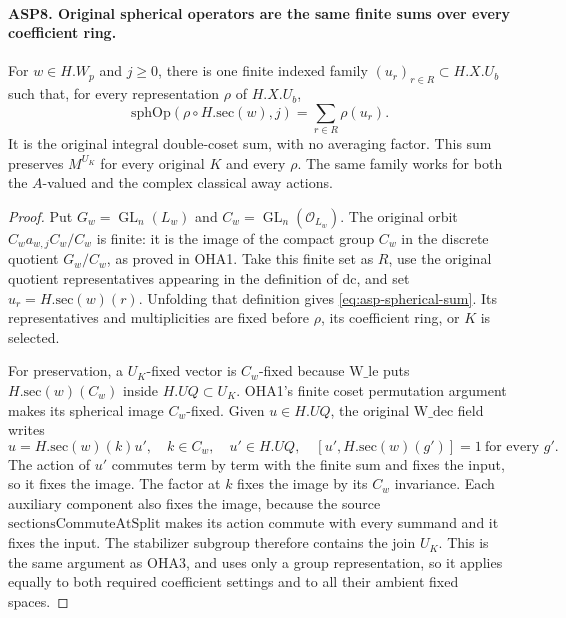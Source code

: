 \paragraph{ASP8. Original spherical operators are the same finite sums over every coefficient ring.}
\label{claim:ASP8}
For $w\in H.W_p$ and $j\geq0$, there is one
finite indexed family $(u_r)_{r\in R}\subset H.X.U_b$
such that, for every representation $\rho$ of
$H.X.U_b$,
\begin{equation}\label{eq:asp-spherical-sum}
 \mathrm{sphOp}(\rho\circ H.\mathrm{sec}(w),j)
                           =\sum_{r\in R}\rho(u_r).
\end{equation}
It is the original integral double-coset sum, with
no averaging factor.  This sum preserves
$M^{U_K}$ for every original $K$ and every $\rho$.
The same family works for both the $A$-valued
and the complex classical away actions.
\begin{proof}
Put $G_w=\operatorname{GL}_n(L_w)$ and
$C_w=\operatorname{GL}_n(\mathcal O_{L_w})$.
The original orbit $C_wa_{w,j}C_w/C_w$ is finite:
it is the image of the compact group $C_w$ in
the discrete quotient $G_w/C_w$, as proved in
OHA1.  Take this finite set as $R$, use the
original quotient representatives appearing in
the definition of $\mathrm{dc}$, and set
$u_r=H.\mathrm{sec}(w)(r)$.  Unfolding that
definition gives \eqref{eq:asp-spherical-sum}.
Its representatives and multiplicities are fixed
before $\rho$, its coefficient ring, or $K$
is selected.

For preservation, a $U_K$-fixed vector is
$C_w$-fixed because $\mathrm{W\_le}$ puts
$H.\mathrm{sec}(w)(C_w)$ inside $H.UQ\subset U_K$.
OHA1's finite coset permutation argument makes
its spherical image $C_w$-fixed.  Given
$u\in H.UQ$, the original $\mathrm{W\_dec}$
field writes
\[
 u=H.\mathrm{sec}(w)(k)u',\quad k\in C_w,
 \quad u'\in H.UQ,\quad
       [u',H.\mathrm{sec}(w)(g')]=1\ \text{for every }g'.
\]
The action of $u'$ commutes term by term with
the finite sum and fixes the input, so it fixes
the image.  The factor at $k$ fixes the image
by its $C_w$ invariance.  Each auxiliary component
also fixes the image, because the source
$\mathrm{sectionsCommuteAtSplit}$ makes its
action commute with every summand and it fixes
the input.  The stabilizer subgroup therefore
contains the join $U_K$.  This is the same
argument as OHA3, and uses only a group
representation, so it applies equally to both
required coefficient settings and to all their
ambient fixed spaces.
\end{proof}


